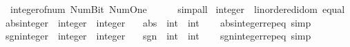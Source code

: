 \begin{isabellebody}
\ \ {\isachardoublequoteopen}integer{\isacharunderscore}{\kern0pt}of{\isacharunderscore}{\kern0pt}num\ {\isacharparenleft}{\kern0pt}Num{\isachardot}{\kern0pt}Bit{}\ Num{\isachardot}{\kern0pt}One{\isacharparenright}{\kern0pt}\ {\isacharequal}{\kern0pt}\ {}{\isachardoublequoteclose}\isanewline
%
\isadelimproof
\ \ %
\endisadelimproof
%
\isatagproof
{}\isamarkupfalse%
\ simp{\isacharunderscore}{\kern0pt}all%
\endisatagproof
{\isafoldproof}%
%
\isadelimproof
\isanewline
%
\endisadelimproof
\isanewline
{}\isamarkupfalse%
\ integer\ {\isacharcolon}{\kern0pt}{\isacharcolon}{\kern0pt}\ {\isachardoublequoteopen}{\isacharbraceleft}{\kern0pt}linordered{\isacharunderscore}{\kern0pt}idom{\isacharcomma}{\kern0pt}\ equal{\isacharbraceright}{\kern0pt}{\isachardoublequoteclose}\isanewline
{}\isanewline
\isanewline
{}\isamarkupfalse%
\ abs{\isacharunderscore}{\kern0pt}integer\ {\isacharcolon}{\kern0pt}{\isacharcolon}{\kern0pt}\ {\isachardoublequoteopen}integer\ {\isasymRightarrow}\ integer{\isachardoublequoteclose}\isanewline
\ \ \ {\isachardoublequoteopen}abs\ {\isacharcolon}{\kern0pt}{\isacharcolon}{\kern0pt}\ int\ {\isasymRightarrow}\ int{\isachardoublequoteclose}\isanewline
%
\isadelimproof
\ \ %
\endisadelimproof
%
\isatagproof
\isacommand{{\isachardot}{\kern0pt}}\isamarkupfalse%
%
\endisatagproof
{\isafoldproof}%
%
\isadelimproof
\isanewline
%
\endisadelimproof
\isanewline
{}\isamarkupfalse%
\ abs{\isacharunderscore}{\kern0pt}integer{\isachardot}{\kern0pt}rep{\isacharunderscore}{\kern0pt}eq\ {\isacharbrackleft}{\kern0pt}simp{\isacharbrackright}{\kern0pt}\isanewline
\isanewline
{}\isamarkupfalse%
\ sgn{\isacharunderscore}{\kern0pt}integer\ {\isacharcolon}{\kern0pt}{\isacharcolon}{\kern0pt}\ {\isachardoublequoteopen}integer\ {\isasymRightarrow}\ integer{\isachardoublequoteclose}\isanewline
\ \ \ {\isachardoublequoteopen}sgn\ {\isacharcolon}{\kern0pt}{\isacharcolon}{\kern0pt}\ int\ {\isasymRightarrow}\ int{\isachardoublequoteclose}\isanewline
%
\isadelimproof
\ \ %
\endisadelimproof
%
\isatagproof
\isacommand{{\isachardot}{\kern0pt}}\isamarkupfalse%
%
\endisatagproof
{\isafoldproof}%
%
\isadelimproof
\isanewline
%
\endisadelimproof
\isanewline
{}\isamarkupfalse%
\ sgn{\isacharunderscore}{\kern0pt}integer{\isachardot}{\kern0pt}rep{\isacharunderscore}{\kern0pt}eq\ {\isacharbrackleft}{\kern0pt}simp{\isacharbrackright}{\kern0pt}\isanewline

\end{isabellebody}
